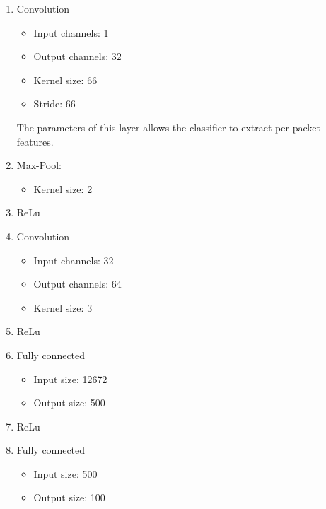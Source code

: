 \documentclass[10pt,conference,compsocconf]{IEEEtran}
\begin{document}
\begin{enumerate}
    \item Convolution
        \begin{itemize}
            \item Input channels: 1
            \item Output channels: 32
            \item Kernel size: 66
            \item Stride: 66
        \end{itemize}
        The parameters of this layer allows the classifier to extract per packet features.
    \item Max-Pool: 
        \begin{itemize}
         \item Kernel size: 2
        \end{itemize}
    \item ReLu
    \item Convolution
        \begin{itemize}
            \item Input channels: 32
            \item Output channels: 64
            \item Kernel size: 3
        \end{itemize}
    \item ReLu
    \item Fully connected
        \begin{itemize}
            \item Input size: 12672
            \item Output size: 500
        \end{itemize}
    \item ReLu
    \item Fully connected
        \begin{itemize}
            \item Input size: 500
            \item Output size: 100
        \end{itemize}
\end{enumerate}
\end{document}
